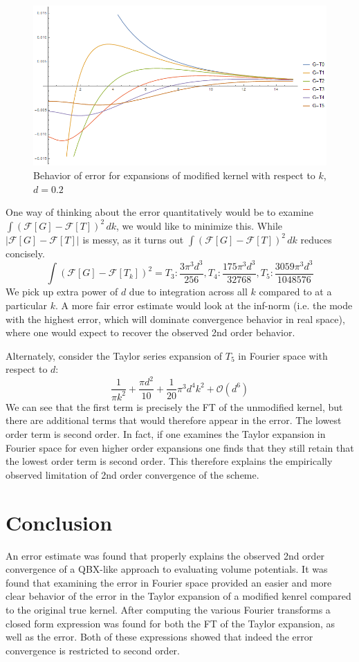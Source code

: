 \documentclass[letterpaper,10pt]{article}
\begin{document}
\begin{figure}
\centering
\includegraphics[width=5in]{G-T.PNG}
\caption{Behavior of error for expansions of modified kernel with respect to $k$, $d=0.2$}
\end{figure}

One way of thinking about the error quantitatively would be to examine $\int (\mathcal{F}[G]-\mathcal{F}[T])^2 \, dk$, we would like to minimize this. While $|\mathcal{F}[G]-\mathcal{F}[T]|$ is messy, as it turns out $\int (\mathcal{F}[G]-\mathcal{F}[T])^2 \, dk$ reduces concisely.
$$\int (\mathcal{F}[G]-\mathcal{F}[T_k])^2 = T_3: \frac{3 \pi ^3 d^3}{256}, T_4:\frac{175 \pi ^3 d^3}{32768} ,T_5: \frac{3059 \pi ^3 d^3}{1048576}$$
We pick up extra power of $d$ due to integration across all $k$ compared to at a particular $k$. A more fair error estimate would look at the inf-norm (i.e. the mode with the highest error, which will dominate convergence behavior in real space), where one would expect to recover the observed 2nd order behavior.

Alternately, consider the Taylor series expansion of $T_5$  in Fourier space with respect to $d$:
$$ \frac{1}{\pi k^2} +\frac{\pi d^2}{10}+ \frac{1}{20} \pi ^3 d^4 k^2+ \mathcal{O}(d^6)$$
We can see that the first term is precisely the FT of the unmodified kernel, but there are additional terms that would therefore appear in the error. The lowest order term is second order. In fact, if one examines the Taylor expansion in Fourier space for even higher order expansions one finds that they still retain that the lowest order term is second order. This therefore explains the empirically observed limitation of 2nd order convergence of the scheme.

\section*{Conclusion}
An error estimate was found that properly explains the observed 2nd order convergence of a QBX-like approach to evaluating volume potentials. It was found that examining the error in Fourier space provided an easier and more clear behavior of the error in the Taylor expansion of a modified kenrel compared to the original true kernel. After computing the various Fourier transforms a closed form expression was found for both the FT of the Taylor expansion, as well as the error. Both of these expressions showed that indeed the error convergence is restricted to second order.
\end{document}
